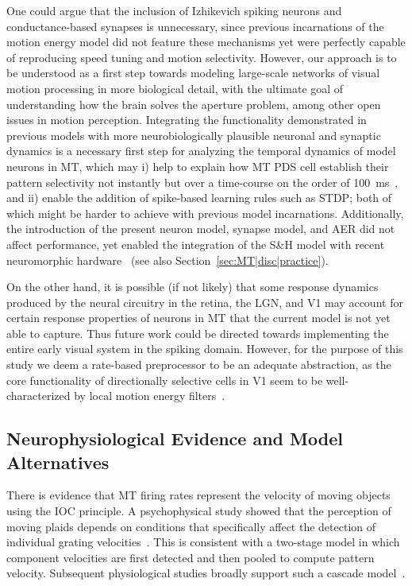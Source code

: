 One could argue that the inclusion of Izhikevich spiking
neurons and conductance-based synapses is unnecessary,
since previous incarnations of the motion energy model did
not feature these mechanisms yet were perfectly capable of
reproducing speed tuning and motion selectivity. However,
our approach is to be understood as a first step towards modeling
large-scale networks of visual motion processing in more
biological detail, with the ultimate goal of understanding
how the brain solves the aperture problem, among other open
issues in motion perception. Integrating the functionality demonstrated
in previous models with more neurobiologically
plausible neuronal and synaptic dynamics is a necessary first
step for analyzing the temporal dynamics of model neurons
in \ac{MT}, which may i) help to explain how \ac{MT} \ac{PDS} cell
establish their pattern selectivity not instantly but over a
time-course on the order of \SI{100}{\milli\second}~\citep{Smith2005},
and ii) enable the addition of spike-based learning rules such as
\ac{STDP}; both of which might be harder to achieve with previous
model incarnations. Additionally, the introduction of the
present neuron model, synapse model, and \ac{AER} did not affect performance, yet enabled the
integration of the S\&H model with recent neuromorphic 
hardware~\citep{Srinivasa2012} (see also 
Section~\ref{sec:MT|disc|practice}).

On the other hand, it is possible (if not likely) that some
response dynamics produced by the neural circuitry in the
retina, the \ac{LGN}, and \ac{V1} may
account for certain response properties of neurons in \ac{MT}
that the current model is not yet able to capture.
Thus future work could be directed towards implementing
the entire early visual system in the spiking domain.
However, for the purpose of this study we deem a rate-based
preprocessor to be an adequate abstraction, as the core functionality
of directionally selective cells in \ac{V1} seem to be 
well-characterized
by local motion energy 
filters~\citep{AdelsonBergen1985,DeAngelis1993,MovshonNewsome1996}.


\subsection{Neurophysiological Evidence and Model Alternatives}
\label{sec:MT|disc|evidence}
There is evidence that \ac{MT} firing rates represent the velocity of
moving objects using the \ac{IOC} principle. A psychophysical
study showed that the perception of moving plaids depends on
conditions that specifically affect the detection of individual
grating velocities~\citep{AdelsonMovshon1982}. This is consistent
with a two-stage model in which component velocities
are first detected and then pooled to compute pattern velocity.
Subsequent physiological studies broadly support such a cascade
model~\citep{PerroneThiele2001,Rust2006,Smith2005}.

